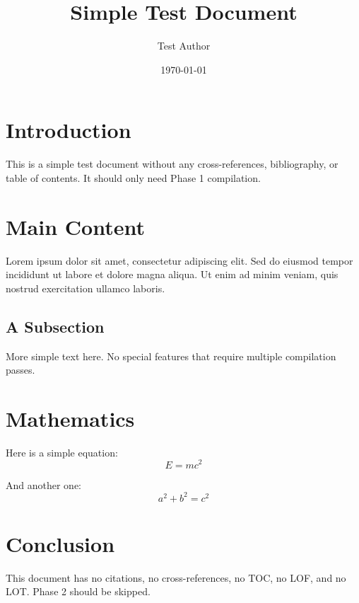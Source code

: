 \documentclass[12pt,a4paper]{article}
\title{Simple Test Document}
\author{Test Author}
\date{\today}
\begin{document}
\maketitle

\section{Introduction}

This is a simple test document without any cross-references, bibliography, or table of contents. It should only need Phase 1 compilation.

\section{Main Content}

Lorem ipsum dolor sit amet, consectetur adipiscing elit. Sed do eiusmod tempor incididunt ut labore et dolore magna aliqua. Ut enim ad minim veniam, quis nostrud exercitation ullamco laboris.

\subsection{A Subsection}

More simple text here. No special features that require multiple compilation passes.

\section{Mathematics}

Here is a simple equation:
\[
E = mc^2
\]

And another one:
\[
a^2 + b^2 = c^2
\]

\section{Conclusion}

This document has no citations, no cross-references, no TOC, no LOF, and no LOT. Phase 2 should be skipped.
\end{document}

